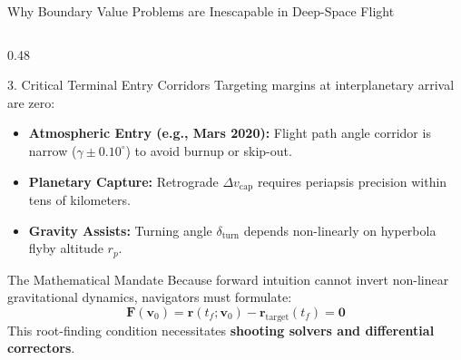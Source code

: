 \documentclass[aspectratio=169, 10pt]{beamer}
\begin{document}
\begin{frame}{Why Boundary Value Problems are Inescapable in Deep-Space Flight}
\begin{columns}[t]
        \begin{column}{0.48\textwidth}
            \begin{block}{3. Critical Terminal Entry Corridors}
                \scriptsize
                Targeting margins at interplanetary arrival are zero:
                \begin{itemize}\setlength{\itemsep}{1.5pt}
                    \item \textbf{Atmospheric Entry (e.g., Mars 2020):} Flight path angle corridor is narrow ($\gamma \pm 0.10^\circ$) to avoid burnup or skip-out.
                    \item \textbf{Planetary Capture:} Retrograde $\Delta v_{\text{cap}}$ requires periapsis precision within tens of kilometers.
                    \item \textbf{Gravity Assists:} Turning angle $\delta_{\text{turn}}$ depends non-linearly on hyperbola flyby altitude $r_p$.
                \end{itemize}
            \end{block}

            \vspace{-0.08cm}

            \begin{alertblock}{The Mathematical Mandate}
                \scriptsize
                Because forward intuition cannot invert non-linear gravitational dynamics, navigators must formulate:
                \vspace{-0.05cm}
                \begin{equation*}
                    \mathbf{F}(\mathbf{v}_0) = \mathbf{r}(t_f; \mathbf{v}_0) - \mathbf{r}_{\text{target}}(t_f) = \mathbf{0}
                \end{equation*}
                \vspace{-0.01cm}
                This root-finding condition necessitates \textbf{shooting solvers and differential correctors}.
            \end{alertblock}
        \end{column}
    \end{columns}
\end{frame}
\end{document}
